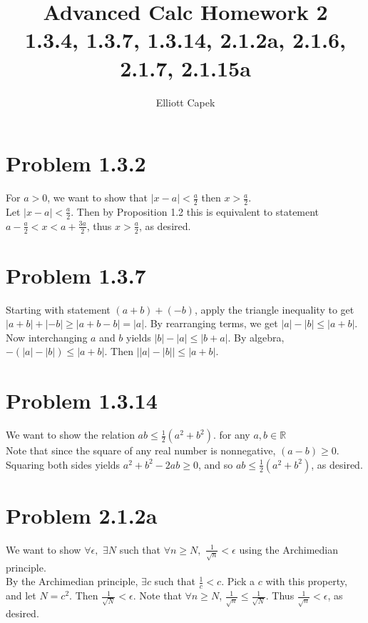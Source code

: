 \documentclass[10pt]{article} %
\title{Advanced Calc Homework 2\\ \large 1.3.4, 1.3.7, 1.3.14, 2.1.2a, 2.1.6, 2.1.7, 2.1.15a}
\author{Elliott Capek}
\begin{document}
\maketitle{}

\section{Problem 1.3.2}
For $a > 0$, we want to show that $|x - a| < \frac a2$ then $x > \frac a2$.\\

Let $|x - a| < \frac a2$. Then by Proposition 1.2 this is equivalent to statement $a - \frac a2 < x < a + \frac{3a}{2}$, thus $x > \frac a2$, as desired.\\

\section{Problem 1.3.7}
Starting with statement $(a+b) + (-b)$, apply the triangle inequality to get $|a+b| + |-b| \geq |a + b -b| = |a|$. By rearranging terms, we get $|a| - |b| \leq |a+b|$.\\

Now interchanging $a$ and $b$ yields $|b| - |a| \leq |b+a|$. By algebra, $-\left(|a| - |b|\right) \leq |a+b|$. Then $\left||a| - |b|\right| \leq |a+b|$.\\

\section{Problem 1.3.14}
We want to show the relation $ab \leq \frac12\left(a^2+b^2\right)$. for any $a,b\in\mathbb{R}$\\

Note that since the square of any real number is nonnegative, $\left(a-b\right) \geq 0$. Squaring both sides yields $a^2 + b^2 - 2ab \geq 0$, and so $ab \leq \frac12\left(a^2+b^2\right)$, as desired.\\

\section{Problem 2.1.2a}
We want to show $\forall \epsilon,$ $\exists N$ such that $\forall n \geq N,$ $\frac{1}{\sqrt{n}} < \epsilon$ using the Archimedian principle.\\

By the Archimedian principle, $\exists c$ such that $\frac{1}{c} < c$. Pick a $c$ with this property, and let $N = c^2$. Then $\frac{1}{\sqrt{N}} < \epsilon$. Note that $\forall n \geq N$, $\frac{1}{\sqrt{n}} \leq \frac{1}{\sqrt{N}}$. Thus $\frac{1}{\sqrt{n}} < \epsilon$, as desired.\\
\end{document}
